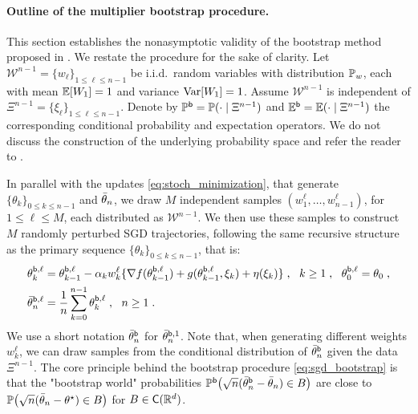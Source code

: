 \paragraph{Outline of the multiplier bootstrap procedure.}
This section establishes the nonasymptotic validity of the bootstrap method proposed in \cite{JMLR:v19:17-370}. We restate the procedure for the sake of clarity. Let 
\(\mathcal{W}^{n-1} = \{w_{\ell}\}_{1 \leq \ell \leq n-1}\)
be  i.i.d.\ random variables with distribution $\mathbb{P}_w$, each with mean \(\mathbb{E}[W_1] = 1\) and variance \(\operatorname{Var}[W_1] = 1\). Assume \(\mathcal{W}^{n-1}\) is independent of
\(\Xi^{n-1} = \{\xi_{\ell}\}_{1 \leq \ell \leq n-1}\). Denote by \(\mathbb{P}^{\mathsf{b}} = \mathbb{P}(\cdot \mid \Xi^{n-1})\) and \(\mathbb{E}^{\mathsf{b}} = \mathbb{E}(\cdot \mid \Xi^{n-1})\) the corresponding conditional probability and expectation operators. We do not discuss the construction of the underlying probability space and refer the reader to \cite{bucher2019note}.
\par 
In parallel with the updates \eqref{eq:stoch_minimization}, that generate 
\(\{\theta_{k}\}_{0 \leq k \leq n-1}\) 
and \(\bar{\theta}_{n}\),
we draw \(M\) independent samples 
\((w_{1}^{\ell}, \ldots, w_{n-1}^{\ell})\), for 
\(1 \leq \ell \leq M\),
each distributed as \(\mathcal{W}^{n-1}\). We then use these samples to construct \(M\) randomly perturbed SGD trajectories, following the same recursive structure as the primary sequence 
\(\{\theta_k\}_{0 \leq k \leq n-1}\), that is: 
\begin{equation}
\label{eq:sgd_bootstrap}
\begin{split}
 \theta_{k}^{\mathsf{b},\ell} 
&= \theta_{k-1}^{\mathsf{b},\ell} - \alpha_{k} w_k^{\ell}\{\nabla f(\theta_{k-1}^{\mathsf{b},\ell})+g(\theta_{k-1}^{\mathsf{b},\ell}, \xi_k) + \eta(\xi_k)\} \;,~~ k \geq 1 \;, ~~ \theta_{0}^{\mathsf{b},\ell} = \theta_{0} \;, \\
\bar{\theta}_{n}^{\mathsf{b},\ell} 
&=  \frac{1}{n} \sum_{k=0}^{n-1} \theta_k^{\mathsf{b},\ell} \;, ~~n \geq 1 \;.
\end{split}
\end{equation}
We use a short notation $\bar{\theta}_{n}^{\mathsf{b}}$ for $\bar{\theta}_{n}^{\mathsf{b},1}$. Note that, when generating different weights $w_{k}^{\ell}$, we can draw samples from the conditional distribution of $\bar{\theta}_{n}^{\mathsf{b}}$ given the data $\Xi^{n-1}$. The core principle behind the bootstrap procedure \eqref{eq:sgd_bootstrap} is that the "bootstrap world" probabilities $\mathbb{P}^{\mathsf{b}}\big(\sqrt{n} (\bar{\theta}_{n}^{\mathsf{b}} - \bar{\theta}_n) \in B \big)$ are close to $\mathbb{P}\big(\sqrt{n} (\bar{\theta}_n - \theta^\star) \in B\big)$ for $B \in \mathsf{C}(\mathbb{R}^{d})$.

